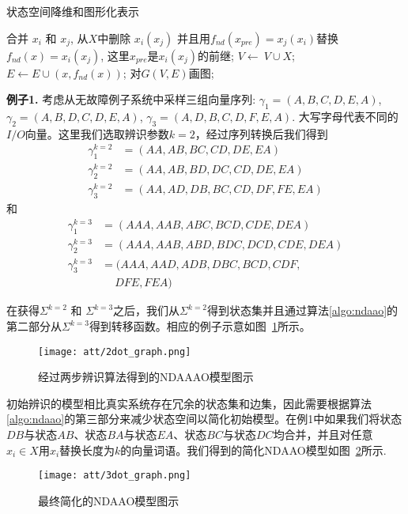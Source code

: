 \begin{algorithm}[h]
  \caption{状态空间降维和图形化表示}
  \label{algo:graph}
   \begin{algorithmic}[1]
        \State 合并 $x_i$ 和 $x_j$, 从$X$中删除 $x_i(x_j)$ 并且用$f_{nd}(x_{pre})=x_j(x_i)$替换$f_{nd}(x)=x_i(x_j)$, 这里$x_{pre}$是$x_i(x_j)$的前继;  
      \EndIf
    \EndFor
    \State $V\leftarrow\ V\cup X$;
    \State $E \leftarrow E\cup (x,f_{nd}(x))$;
    \State 对$G(V,E)$画图;
  \end{algorithmic}
\end{algorithm}
\textbf{例子1.} 考虑从无故障例子系统中采样三组向量序列: $\gamma_1=(A,B,C,D,E,A)$, $\gamma_2=(A,B,D,C,D,E,A)$, $\gamma_3=(A,D,B,C,D,F,E,A)$. 大写字母代表不同的$I/O$向量。这里我们选取辨识参数$k=2$，经过序列转换后我们得到 \[\begin{split} \gamma_1^{k=2}&=(AA,AB,BC,CD,DE,EA)\\ \gamma_2^{k=2}&=(AA,AB,BD,DC,CD,DE,EA)\\\gamma_3^{k=2}&=(AA,AD,DB,BC,CD,DF,FE,EA) \end{split}\] 和 \[\begin{split} \gamma_1^{k=3}&=(AAA,AAB,ABC,BCD,CDE,DEA)\\ \gamma_2^{k=3}&=(AAA,AAB,ABD,BDC,DCD,CDE,DEA)\\\gamma_3^{k=3}&=(AAA,AAD,ADB,DBC,BCD,CDF,\\&\quad \ DFE,FEA) \end{split}\]

在获得$\Sigma^{k=2}$ 和 $\Sigma^{k=3}$之后，我们从$\Sigma^{k=2}$得到状态集并且通过算法\ref{algo:ndaao}的第二部分从$\Sigma^{k=3}$得到转移函数。相应的例子示意如图~\ref{fig5}所示。

\begin{figure}[!htb]
  \centering
  \texttt{[image: att/2dot\_graph.png]}
  \caption{经过两步辨识算法得到的NDAAAO模型图示}
  \label{fig5}
\end{figure}

初始辨识的模型相比真实系统存在冗余的状态集和边集，因此需要根据算法\ref{algo:ndaao}的第三部分来减少状态空间以简化初始模型。在例1中如果我们将状态$ DB $与状态$ AB $、状态$ BA $与状态$ EA $、状态$ BC $与状态$ DC $均合并，并且对任意$x_i \in X$用$x_i$替换长度为$k$的向量词语。我们得到的简化NDAAO模型如图~\ref{fig6}所示.

\begin{figure}[!htb]{}
  \centering
  \texttt{[image: att/3dot\_graph.png]}
  \caption{最终简化的NDAAO模型图示}
  \label{fig6}
\end{figure}

